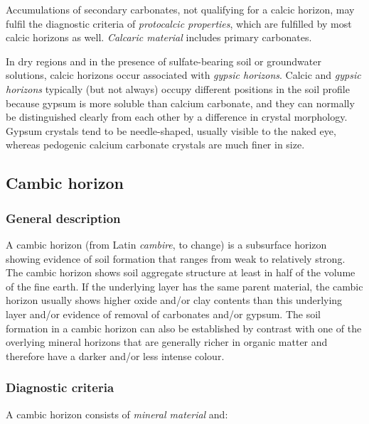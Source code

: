 \documentclass[
  letterpaper,
  DIV=11,
  numbers=noendperiod]{scrreprt}
\begin{document}
Accumulations of secondary carbonates, not qualifying for a calcic
horizon, may fulfil the diagnostic criteria of \emph{protocalcic
properties}, which are fulfilled by most calcic horizons as well.
\emph{Calcaric material} includes primary carbonates.

In dry regions and in the presence of sulfate-bearing soil or
groundwater solutions, calcic horizons occur associated with
\emph{gypsic horizons}. Calcic and \emph{gypsic horizons} typically (but
not always) occupy different positions in the soil profile because
gypsum is more soluble than calcium carbonate, and they can normally be
distinguished clearly from each other by a difference in crystal
morphology. Gypsum crystals tend to be needle-shaped, usually visible to
the naked eye, whereas pedogenic calcium carbonate crystals are much
finer in size.

\hypertarget{cambic-horizon}{%
\subsection{Cambic horizon}\label{cambic-horizon}}

\hypertarget{general-description-4}{%
\subsubsection{General description}\label{general-description-4}}

A cambic horizon (from Latin \emph{cambire}, to change) is a subsurface
horizon showing evidence of soil formation that ranges from weak to
relatively strong. The cambic horizon shows soil aggregate structure at
least in half of the volume of the fine earth. If the underlying layer
has the same parent material, the cambic horizon usually shows higher
oxide and/or clay contents than this underlying layer and/or evidence of
removal of carbonates and/or gypsum. The soil formation in a cambic
horizon can also be established by contrast with one of the overlying
mineral horizons that are generally richer in organic matter and
therefore have a darker and/or less intense colour.

\hypertarget{diagnostic-criteria-4}{%
\subsubsection{Diagnostic criteria}\label{diagnostic-criteria-4}}

A cambic horizon consists of \emph{mineral material} and:
\end{document}

